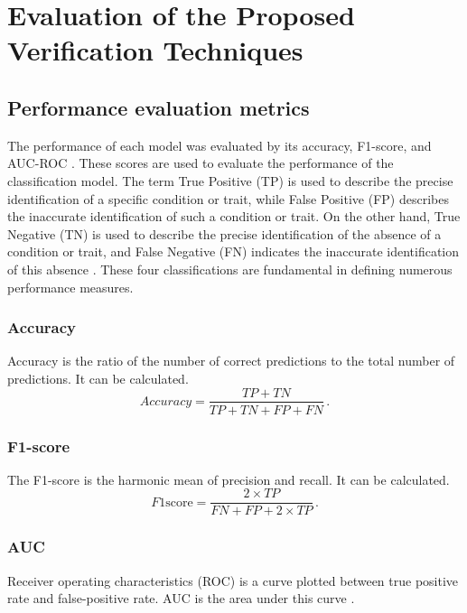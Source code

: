 \section{Evaluation of the Proposed Verification Techniques}
    \subsection{Performance evaluation metrics}
    The performance of each model was evaluated by its accuracy, F1-score, and AUC-ROC \cite{sharma2023recent}. These scores are used to evaluate the performance of the classification
    model. The term True Positive (TP) is used to describe the precise
    identification of a specific condition or trait, while False Positive (FP) describes
    the inaccurate identification of such a condition or trait. On the other
    hand, True Negative (TN) is used to describe the precise identification of the
    absence of a condition or trait, and False Negative (FN) indicates the
    inaccurate identification of this absence \cite{sharma2023recent}. These four classifications
    are fundamental in defining numerous performance measures.

    \subsubsection{Accuracy}
    Accuracy is the ratio of the number of correct predictions to the total number
    of predictions. It can be calculated.
    \begin{equation*}
        Accuracy=\frac{TP+TN}{TP+TN+FP+FN}\,. \tag{1}
    \label{equ:Acc}
    \end{equation*}

    \subsubsection{F1-score}
    The F1-score is the harmonic mean of precision and recall. It can be calculated.
    \begin{equation*}
        F1\text{score}= \frac{2 \times TP}{FN + FP + 2 \times TP}\,. \tag{2}
    \label{equ:F1}
    \end{equation*}

    \subsubsection{AUC}
    Receiver operating characteristics (ROC) is a curve plotted between true positive rate and false-positive rate. AUC is the area under this curve \cite{kuremoto2018enhancing}.


